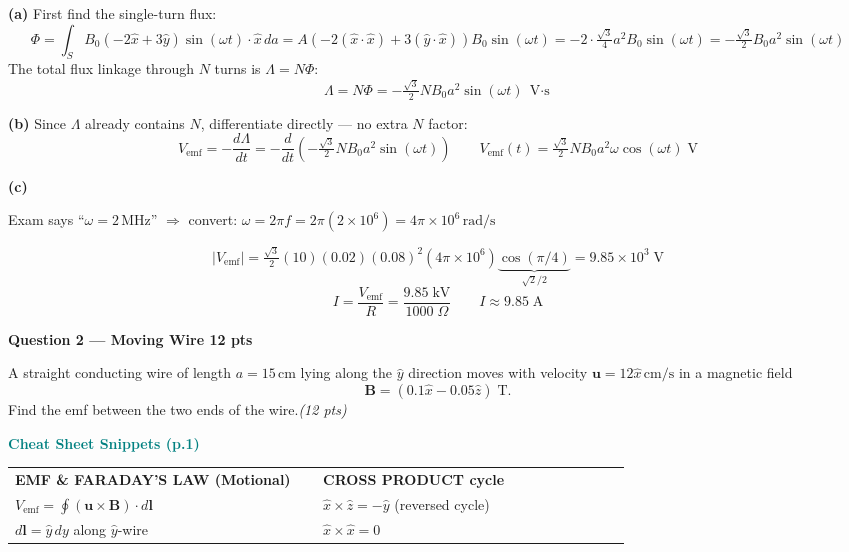 \documentclass[11pt,letterpaper]{article}
\begin{document}
\textbf{(a)} First find the single-turn flux:
\[
\Phi=\int_S B_0(-2\hat{x}+3\hat{y})\sin(\omega t)\cdot\hat{x}\,da
=A\!\left(-2(\hat{x}\cdot\hat{x})+3(\hat{y}\cdot\hat{x})\right)B_0\sin(\omega t)
=-2\cdot\tfrac{\sqrt{3}}{4}a^2 B_0\sin(\omega t)
=-\tfrac{\sqrt{3}}{2}B_0 a^2\sin(\omega t)
\]
The total flux linkage through $N$ turns is $\Lambda=N\Phi$:
\[\boxed{\Lambda=N\Phi=-\tfrac{\sqrt{3}}{2}N B_0 a^2\sin(\omega t)\;\text{V$\cdot$s}}\]

\textbf{(b)} Since $\Lambda$ already contains $N$, differentiate directly --- no extra $N$ factor:
\[V_\text{emf}=-\frac{d\Lambda}{dt}=-\frac{d}{dt}\!\left(-\tfrac{\sqrt{3}}{2}N B_0 a^2\sin(\omega t)\right)
\qquad\boxed{V_\text{emf}(t)=\tfrac{\sqrt{3}}{2}N B_0 a^2\omega\cos(\omega t)\;\text{V}}\]

\textbf{(c)}
\begin{notebox}
Exam says ``$\omega=2\,\text{MHz}$'' $\Rightarrow$ convert: $\omega=2\pi f=2\pi(2\times10^6)=4\pi\times10^6\,\text{rad/s}$
\end{notebox}
\[|V_\text{emf}|=\tfrac{\sqrt{3}}{2}(10)(0.02)(0.08)^2(4\pi\times10^6)\underbrace{\cos(\pi/4)}_{\sqrt{2}/2}=9.85\times10^3\;\text{V}\]
\[I=\frac{V_\text{emf}}{R}=\frac{9.85\;\text{kV}}{1000\;\Omega}\qquad\boxed{I\approx9.85\;\text{A}}\]

\newpage
\colorbox{purplebg}{\parbox{\dimexpr\linewidth-2\fboxsep}{\color{purple}\large\textbf{Question 2 --- Moving Wire \hfill 12 pts}}}

\begin{qbox}
A straight conducting wire of length $a=15\,\text{cm}$ lying along the $\hat{y}$ direction moves with velocity $\mathbf{u}=12\hat{x}\,\text{cm/s}$ in a magnetic field
\[\mathbf{B}=(0.1\hat{x}-0.05\hat{z})\;\text{T}.\]
Find the emf between the two ends of the wire.\hfill\textit{(12 pts)}
\end{qbox}

\begin{cssnip}
\textbf{\small\textcolor{teal}{Cheat Sheet Snippets (p.1)}}\\[3pt]
\begin{tabular}{@{}p{0.47\linewidth}p{0.47\linewidth}@{}}
\textbf{EMF \& FARADAY'S LAW (Motional)} & \textbf{CROSS PRODUCT cycle}\\
$V_\text{emf}=\displaystyle\oint(\mathbf{u}\times\mathbf{B})\cdot d\mathbf{l}$ &
$\hat{x}\times\hat{z}=-\hat{y}$ (reversed cycle)\\
$d\mathbf{l}=\hat{y}\,dy$ along $\hat{y}$-wire & $\hat{x}\times\hat{x}=0$
\end{tabular}
\end{cssnip}
\end{document}
